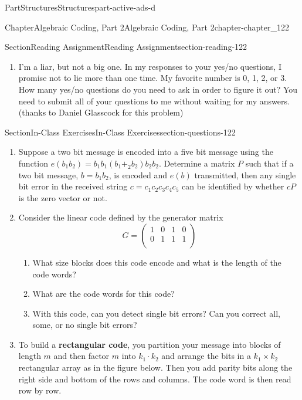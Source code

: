 \documentclass[oneside,10pt,]{book}
\newcommand{\terminology}[1]{\textbf{#1}}
\numberwithin{equation}{section}
\begin{document}
\begin{partptx}{Part}{Structures}{}{Structures}{}{}{part-active-ads-d}
\begin{chapterptx}{Chapter}{Algebraic Coding, Part 2}{}{Algebraic Coding, Part 2}{}{}{chapter-chapter_122}
\begin{sectionptx}{Section}{Reading Assignment}{}{Reading Assignment}{}{}{section-reading-122}
\begin{enumerate}[label=\arabic*.]
\begin{equation*}
\end{equation*}
cannot be the code words of a linear code?%
\item{}I'm a liar, but not a big one.  In my responses to your yes\slash{}no questions, I promise not to lie more than one time. My favorite number is 0, 1, 2, or 3.  How many yes\slash{}no questions do you need to ask in order to figure it out? You need to submit all of your questions to me without waiting for my answers. (thanks to Daniel Glasscock for this problem)%
\end{enumerate}
%
\end{sectionptx}
%
%
\typeout{************************************************}
\typeout{************************************************}
%
\begin{sectionptx}{Section}{In-Class Exercises}{}{In-Class Exercises}{}{}{section-questions-122}
%
\begin{enumerate}[label=\arabic*.]
\item{}Suppose a two bit message is encoded into a five bit message using the function \(e(b_{1}b_{2})=b_{1}b_{1}(b_{1}+_2 b_{2})b_{2}b_{2}\).  Determine a matrix \(P\) such that if a two bit message, \(b = b_{1}b_{2}\), is encoded and \(e(b)\) transmitted, then any single bit error in the received string \(c=c_{1}c_{2}c_{3}c_{4}c_{5}\) can be identified by whether \(c P\) is the zero vector or not.%
\item{}Consider the  linear code defined by the generator matrix%
\begin{equation*}
G=\left(
\begin{array}{cccc}
1 & 0 & 1 & 0 \\
0 & 1 & 1 & 1 \\
\end{array}
\right)
\end{equation*}
%
\par
%
\begin{enumerate}[label=(\alph*)]
\item{}What size blocks does this code encode and what is the length of the code words?%
\item{}What are the code words for this code?%
\item{}With this code, can you detect single bit errors?  Can you correct all, some, or no single bit errors?%
\end{enumerate}
%
\item{}To build a \terminology{rectangular code}, you partition your message into blocks of length \(m\) and then factor \(m\) into \(k_1\cdot k_2\)  and arrange the bits in a  \(k_1 \times k_2\) rectangular array as in the figure below.  Then you add parity bits along the right side and bottom of the rows and columns.   The code word is then read row by row.%

\end{enumerate}
\end{sectionptx}
\end{chapterptx}
\end{partptx}
\end{document}

